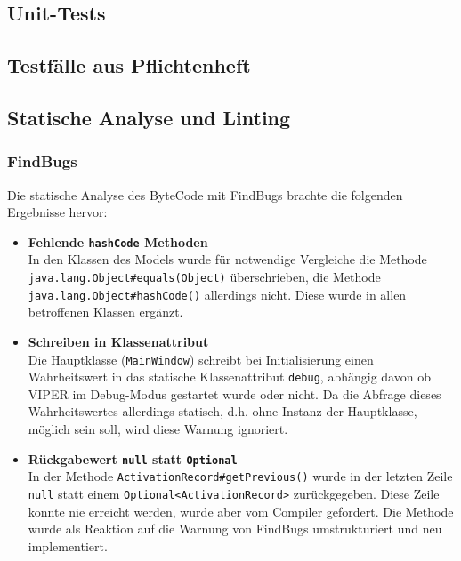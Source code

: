 \documentclass[parskip=full,11pt,twoside]{scrartcl}
\begin{document}
\subsection{Unit-Tests}



\subsection{Testfälle aus Pflichtenheft}

\subsection{Statische Analyse und Linting}

\subsubsection{FindBugs}

Die statische Analyse des ByteCode mit FindBugs brachte die folgenden Ergebnisse hervor:

\begin{itemize}
  \item \textbf{Fehlende \texttt{hashCode} Methoden}\\
        In den Klassen des Models wurde für notwendige Vergleiche die Methode \texttt{java.lang.Object\#equals(Object)} überschrieben, die Methode \texttt{java.lang.Object\#hashCode()} allerdings nicht. Diese wurde in allen betroffenen Klassen ergänzt.
  \item \textbf{Schreiben in Klassenattribut}\\
        Die Hauptklasse (\texttt{MainWindow}) schreibt bei Initialisierung einen Wahrheitswert in das statische Klassenattribut \texttt{debug}, abhängig davon ob VIPER im Debug-Modus gestartet wurde oder nicht. Da die Abfrage dieses Wahrheitswertes allerdings statisch, d.h. ohne Instanz der Hauptklasse, möglich sein soll, wird diese Warnung ignoriert.
  \item \textbf{Rückgabewert \texttt{null} statt \texttt{Optional}}\\
        In der Methode \texttt{ActivationRecord\#getPrevious()} wurde in der letzten Zeile \texttt{null} statt einem \texttt{Optional<ActivationRecord>} zurückgegeben. Diese Zeile konnte nie erreicht werden, wurde aber vom Compiler gefordert. Die Methode wurde als Reaktion auf die Warnung von FindBugs umstrukturiert und neu implementiert.
\end{itemize}
\end{document}
